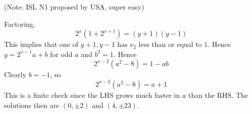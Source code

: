 (Note: ISL N1 proposed by USA, super easy)

Factoring,
$$2^x(1+2^{x+1})=(y+1)(y-1)$$
This implies that one of $y+1, y-1$ has $\nu_2$ less than or equal to $1$.
Hence $y=2^{x-1}a+b$ for odd $a$ and $b^2=1$. Hence
$$2^{x-2}(a^2-8)=1-ab$$
Clearly $b=-1$, so
$$2^{x-2}(a^2-8)=a+1$$
This is a finite check since the LHS grows much faster in $a$ than the RHS.
The solutions then are $(0,\pm 2)$ and $(4,\pm 23)$.
